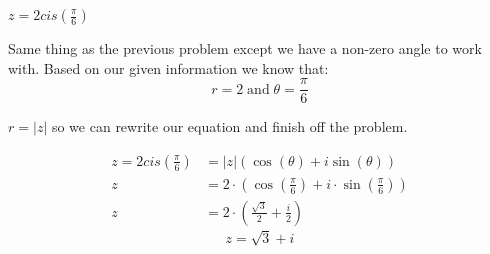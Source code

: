 \begin{problem}[22.]
    $z = 2 cis \left( \frac{\pi}{6} \right)$
\end{problem}

\begin{solution}
    Same thing as the previous problem except we have a non-zero angle to work with. Based on our given information we know that:
    \[\boxed{r = 2} \; \text{and} \; \boxed{ \theta = \frac{\pi}{6}}\]
    
    $r = |z|$ so we can rewrite our equation and finish off the problem.
    
    \begin{align}
        z = 2 cis \left( \frac{\pi}{6} \right) &= |z| (\cos(\theta) + i \sin(\theta)) \\
        z &= 2 \cdot \left( \cos \left( \frac{\pi}{6} \right) + i \cdot \sin \left( \frac{\pi}{6} \right) \right) \\
        z &= 2 \cdot \left( \frac{\sqrt3}{2} + \frac{i}{2}  \right)
    \end{align}
    \[\boxed{z = \sqrt{3} + i}\]
\end{solution}